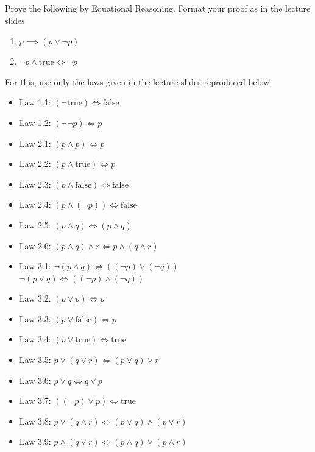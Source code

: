 \documentclass[twocolumn]{article}
\begin{document}
\subsection{}

Prove the following by Equational Reasoning. Format your proof as in the lecture slides

\begin{enumerate}
    \item $p \implies (p \vee \neg p)$
    \item $\neg p \wedge \text{true} \Longleftrightarrow \neg p$
\end{enumerate}

For this, use only the laws given in the lecture slides reproduced below:

\begin{itemize}
    \item Law 1.1: $(\neg\text{true}) \Longleftrightarrow \text{false}$
    \item Law 1.2: $(\neg\neg p) \Longleftrightarrow p$

    \item Law 2.1: $(p \wedge p) \Longleftrightarrow p$
    \item Law 2.2: $(p \wedge \text{true}) \Longleftrightarrow p$
    \item Law 2.3: $(p \wedge \text{false}) \Longleftrightarrow \text{false}$
    \item Law 2.4: $(p \wedge (\neg p)) \Longleftrightarrow \text{false}$
    \item Law 2.5: $(p \wedge q) \Longleftrightarrow(p \wedge q)$
    \item Law 2.6: $(p \wedge q ) \wedge r \Longleftrightarrow p \wedge (q \wedge r)$

    \item Law 3.1: $\neg(p \wedge q) \Longleftrightarrow ((\neg p) \vee (\neg q))$ \\
                        $\neg(p \vee q) \Longleftrightarrow ((\neg p) \wedge (\neg q))$
    \item Law 3.2: $(p \vee p) \Longleftrightarrow p$
    \item Law 3.3: $(p \vee \text{false}) \Longleftrightarrow p$
    \item Law 3.4: $(p \vee \text{true}) \Longleftrightarrow \text{true}$
    \item Law 3.5: $p \vee (q \vee r) \Longleftrightarrow (p \vee q) \vee r$
    \item Law 3.6: $ p \vee q \Longleftrightarrow q \vee p$
    \item Law 3.7: $((\neg p) \vee p) \Longleftrightarrow \text{true}$
    \item Law 3.8: $p \vee (q \wedge r) \Longleftrightarrow (p \vee q) \wedge (p \vee r)$
    \item Law 3.9: $p \wedge (q \vee r) \Longleftrightarrow (p \wedge q) \vee (p \wedge r)$
    

\end{itemize}
\end{document}
